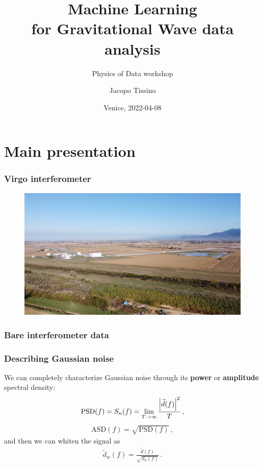 \documentclass{beamer}
\title{Machine Learning \\ for Gravitational Wave data analysis}
\author{Jacopo Tissino}
\subtitle{Physics of Data workshop}
\date{Venice, 2022-04-08}
\begin{document}
\section{Main presentation}
\frame{\titlepage}

\begin{frame}
    \frametitle{Virgo interferometer}
    \begin{figure}[ht]
        \centering
        \includegraphics[width=\textwidth]{figures/Virgo}
        \label{fig:Virgo}
    \end{figure}
\end{frame}

\begin{frame}
    \frametitle{Bare interferometer data}
    \begin{figure}[ht]
    \label{fig:bare}
    \end{figure}
\end{frame}

\begin{frame}
    \frametitle{Describing Gaussian noise}
    We can completely characterize Gaussian noise through its \textbf{power} or \textbf{amplitude}
    spectral density:
    \begin{align}
    \text{PSD}(f) = S_n (f) = \lim _{T \to \infty} \frac{\abs{\widetilde{d}(f)}^2}{T} 
    \,,
    \end{align}
    \begin{align}
    \text{ASD} (f) = \sqrt{\text{PSD}(f)}
    \,,
    \end{align}
    and then we can whiten the signal as %
    \begin{align}
    \widetilde{d}_w (f) = \frac{\widetilde{d}(f)}{\sqrt{S_n(f)}}
    \,.
    \end{align}
\end{frame}
\end{document}
